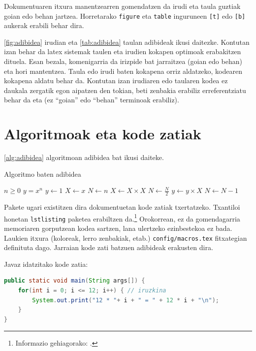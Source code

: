 Dokumentuaren itxura manentzearren gomendatzen da irudi eta taula guztiak goian edo behan jartzea. Horretarako \texttt{figure} eta \texttt{table} inguruneen \texttt{[t]} edo \texttt{[b]} aukerak erabili behar dira.

\ref{fig:adibidea} irudian eta \ref{tab:adibidea} taulan adibideak ikusi daitezke. Kontutan izan behar da latex sistemak taulen eta irudien kokapen optimoak erabakitzen dituela. Esan bezala, komenigarria da irizpide bat jarraitzea (goian edo behan) eta hori mantentzea. Taula edo irudi baten kokapena orriz aldatzeko, kodearen kokapena aldatu behar da. Kontutan izan irudiaren edo taularen kodea ez daukala zergatik egon aipatzen den tokian, beti zenbakia erabiliz erreferentziatu behar da eta (ez ``goian'' edo ``behan'' terminoak erabiliz).

\section{Algoritmoak eta kode zatiak}

\ref{alg:adibidea} algoritmoan adibidea bat ikusi daiteke.

\clearpage

\begin{algorithm}
\caption{Algoritmo baten adibidea}\label{alg:adibidea}
\begin{algorithmic}
\Require $n \geq 0$
\Ensure $y = x^n$
\State $y \gets 1$
\State $X \gets x$
\State $N \gets n$
    \State $X \gets X \times X$
    \State $N \gets \frac{N}{2}$
    \State $y \gets y \times X$
    \State $N \gets N - 1$
\EndIf
\EndWhile
\end{algorithmic}
\end{algorithm}

Pakete ugari existitzen dira dokumentuetan kode zatiak txertatzeko. Txantiloi honetan \texttt{lstlisting} paketea erabiltzen da.\footnote{Informazio gehiagorako: \cite{lstlistingdoc}.} Orokorrean, ez da gomendagarria memoriaren gorputzean kodea sartzen, lana ulertzeko ezinbestekoa ez bada. Laukien itxura (koloreak, lerro zenbakiak, etab.) \texttt{config/macros.tex} fitxategian definituta dago. Jarraian kode zati batzuen adibideak erakusten dira. 

Javaz idatzitako kode zatia:

\begin{lstlisting}[language=Java]
public static void main(String args[]) {
    for(int i = 0; i <= 12; i++) { // iruzkina
        System.out.print("12 * "+ i + " = " + 12 * i + "\n");
    }
}
\end{lstlisting}

